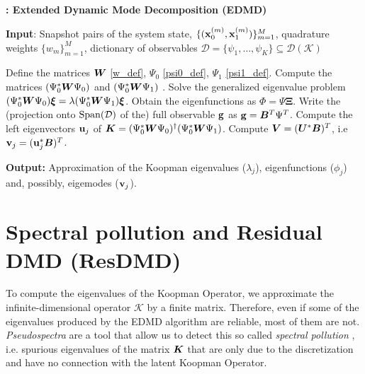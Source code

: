 \begin{algorithm}
\caption{\textbf{: Extended Dynamic Mode Decomposition (EDMD)}}
\label{alg_edmd}
\textbf{Input}: Snapshot pairs of the system state, $\{(\vb{x}_0^{(m)}, \vb{x}_1^{(m)})\}_{m = 1}^M$, quadrature weights $\{w_m\}_{m = 1}^M$, dictionary of observables $\mathcal{D} = \{\psi_1, \dots, \psi_K\} \subseteq \mathcal{D}(\mathcal{K})$
\begin{algorithmic}[1]
\State Define the matrices $\vb*{W}$ \eqref{w_def}, $\Psi_0$ \eqref{psi0_def}, $\Psi_1$ \eqref{psi1_def}. 
\State Compute the matrices $(\Psi_0^*\vb*{W}\Psi_0)$ and $(\Psi_0^*\vb*{W}\Psi_1)$ .
\State Solve the generalized eigenvalue problem $(\Psi_0^*\vb*{W}\Psi_0)\bm{\xi} = \lambda(\Psi_0^*\vb*{W}\Psi_1)\bm{\xi}$.
\State Obtain the eigenfunctions as $\Phi = \Psi\bm{\Xi}$.
    \State Write the (projection onto $\mathrm{Span}(\mathcal{D})$ of the) full observable $\vb{g}$ as $\vb{g} = \vb*{B}^T\Psi^T$.
    \State Compute the left eigenvectors $\vb{u}_j$ of $\vb*{K} = (\Psi_0^*\vb*{W}\Psi_0)^{\dagger}(\Psi_0^*\vb*{W}\Psi_1)$.
    \State Compute $\vb*{V} = (\vb*{U}^*\vb*{B})^T$, i.e $\vb{v}_j = (\vb{u}_j^*\vb*{B})^T$.
\EndIf
\end{algorithmic}
\textbf{Output:} Approximation of the Koopman eigenvalues ($\lambda_j$), eigenfunctions ($\phi_j$) and, possibly, eigemodes ($\vb{v}_j$).
\end{algorithm}


\section{Spectral pollution and Residual DMD (ResDMD)}
\label{section_resdmd}
To compute the eigenvalues of the Koopman Operator, we approximate the infinite-dimensional operator $\mathcal{K}$ by a finite matrix. Therefore, even if some of the eigenvalues produced by the EDMD algorithm are reliable, most of them are not. \emph{Pseudospectra} \cite{trefethen_spectra_2005} are a tool that allow us to detect this so called \emph{spectral pollution} \cite{colbrook_rigorous_2021}, i.e. spurious eigenvalues of the matrix $\vb*{K}$ that are only due to the discretization and have no connection with the latent Koopman Operator.

